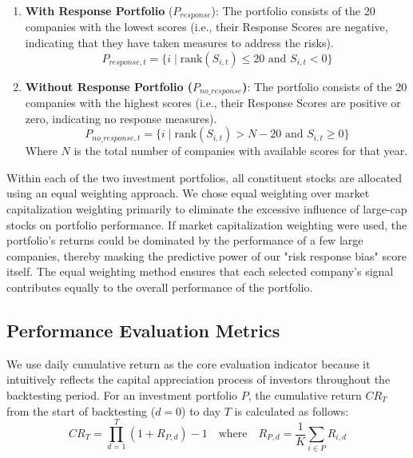 \documentclass[sigconf]{acmart}
\begin{document}
\begin{enumerate}
    \item \textbf{With Response Portfolio} ($P_{response}$): The portfolio consists of the 20 companies with the lowest scores (i.e., their Response Scores are negative, indicating that they have taken measures to address the risks).
    \begin{equation}
        P_{response, t} = \{i \mid \text{rank}(S_{i,t}) \le 20 \text{ and } S_{i,t} < 0\}
    \end{equation}
    \item \textbf{Without Response Portfolio ($P_{no\_response}$)}: The portfolio consists of the 20 companies with the highest scores (i.e., their Response Scores are positive or zero, indicating no response measures).
    \begin{equation}
        P_{no\_response, t} = \{i \mid \text{rank}(S_{i,t}) > N-20 \text{ and } S_{i,t} \geq 0\}
    \end{equation}
    Where $N$ is the total number of companies with available scores for that year.
\end{enumerate}

Within each of the two investment portfolios, all constituent stocks are allocated using an equal weighting approach. We chose equal weighting over market capitalization weighting primarily to eliminate the excessive influence of large-cap stocks on portfolio performance. If market capitalization weighting were used, the portfolio's returns could be dominated by the performance of a few large companies, thereby masking the predictive power of our "risk response bias" score itself. The equal weighting method ensures that each selected company's signal contributes equally to the overall performance of the portfolio.

\subsection{Performance Evaluation Metrics}

We use daily cumulative return as the core evaluation indicator because it intuitively reflects the capital appreciation process of investors throughout the backtesting period. For an investment portfolio $P$, the cumulative return $CR_T$ from the start of backtesting ($d=0$) to day $T$ is calculated as follows:
\begin{equation}
    CR_T = \prod_{d=1}^{T} (1 + R_{P,d})-1 \quad \text{where} \quad R_{P,d} = \frac{1}{K} \sum_{i \in P} R_{i,d}
\end{equation}
\end{document}
